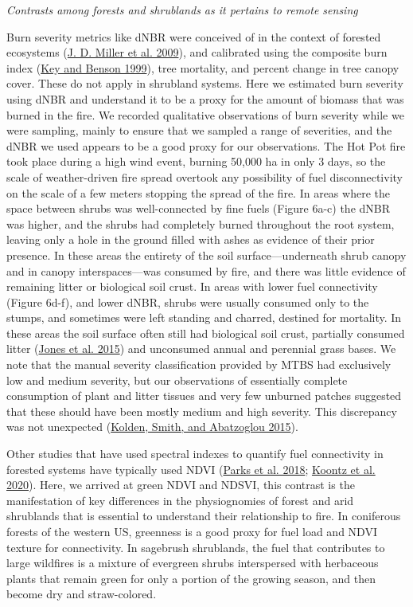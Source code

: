 \documentclass[
  12pt,
]{article}
\begin{document}
\emph{Contrasts among forests and shrublands as it pertains to remote
sensing}

Burn severity metrics like dNBR were conceived of in the context of
forested ecosystems (\protect\hyperlink{ref-Miller2009}{J. D. Miller et
al. 2009}), and calibrated using the composite burn index
(\protect\hyperlink{ref-Key1999}{Key and Benson 1999}), tree mortality,
and percent change in tree canopy cover. These do not apply in shrubland
systems. Here we estimated burn severity using dNBR and understand it to
be a proxy for the amount of biomass that was burned in the fire. We
recorded qualitative observations of burn severity while we were
sampling, mainly to ensure that we sampled a range of severities, and
the dNBR we used appears to be a good proxy for our observations. The
Hot Pot fire took place during a high wind event, burning 50,000 ha in
only 3 days, so the scale of weather-driven fire spread overtook any
possibility of fuel disconnectivity on the scale of a few meters
stopping the spread of the fire. In areas where the space between shrubs
was well-connected by fine fuels (Figure 6a-c) the dNBR was higher, and
the shrubs had completely burned throughout the root system, leaving
only a hole in the ground filled with ashes as evidence of their prior
presence. In these areas the entirety of the soil surface---underneath
shrub canopy and in canopy interspaces---was consumed by fire, and there
was little evidence of remaining litter or biological soil crust. In
areas with lower fuel connectivity (Figure 6d-f), and lower dNBR, shrubs
were usually consumed only to the stumps, and sometimes were left
standing and charred, destined for mortality. In these areas the soil
surface often still had biological soil crust, partially consumed litter
(\protect\hyperlink{ref-Jones2015}{Jones et al. 2015}) and unconsumed
annual and perennial grass bases. We note that the manual severity
classification provided by MTBS had exclusively low and medium severity,
but our observations of essentially complete consumption of plant and
litter tissues and very few unburned patches suggested that these should
have been mostly medium and high severity. This discrepancy was not
unexpected (\protect\hyperlink{ref-Kolden2015}{Kolden, Smith, and
Abatzoglou 2015}).

Other studies that have used spectral indexes to quantify fuel
connectivity in forested systems have typically used NDVI
(\protect\hyperlink{ref-Parks2018}{Parks et al. 2018};
\protect\hyperlink{ref-Koontz2020}{Koontz et al. 2020}). Here, we
arrived at green NDVI and NDSVI, this contrast is the manifestation of
key differences in the physiognomies of forest and arid shrublands that
is essential to understand their relationship to fire. In coniferous
forests of the western US, greenness is a good proxy for fuel load and
NDVI texture for connectivity. In sagebrush shrublands, the fuel that
contributes to large wildfires is a mixture of evergreen shrubs
interspersed with herbaceous plants that remain green for only a portion
of the growing season, and then become dry and straw-colored.
\end{document}
